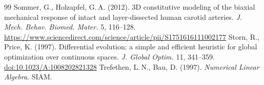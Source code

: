 \begin{thebibliography}{99}
 Sommer, G., Holzapfel, G.\,A. (2012). 3D constitutive modeling of the biaxial mechanical response of intact and layer-dissected human carotid arteries. \emph{J. Mech. Behav. Biomed. Mater.} 5, 116--128. \url{https://www.sciencedirect.com/science/article/pii/S1751616111002177}
 Storn, R., Price, K. (1997). Differential evolution: a simple and efficient heuristic for global optimization over continuous spaces. \emph{J. Global Optim.} 11, 341--359. \href{https://doi.org/10.1023/A:1008202821328}{doi:10.1023/A:1008202821328}
 Trefethen, L.\,N., Bau, D. (1997). \emph{Numerical Linear Algebra}. SIAM.
\end{thebibliography}

